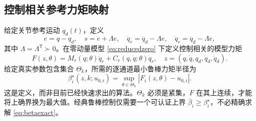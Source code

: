 \documentclass[journal,onecolumn]{IEEEtran}
\newcommand{\abs}[1]{\left\lvert#1\right\rvert}
\newcommand{\tr}{\mathsf T}
\begin{document}
\subsection{控制相关参考力矩映射}
给定关节参考运动 $q_d(t)$，定义
\begin{equation}
 e=q-q_d,\quad s=\dot e+\Lambda e,\quad
 \dot q_r=\dot q_d-\Lambda e,\quad
 \ddot q_r=\ddot q_d-\Lambda\dot e,
 \label{eq:sliding}
\end{equation}
其中 $\Lambda=\Lambda^\tr\succ0$。在零动量模型 \eqref{eq:reducedzero} 下定义控制相关的模型力矩
\begin{equation}
 F(z,\theta)=M_r(q;\theta)\ddot q_r+C_r(q,\dot q;\theta)\dot q_r,\quad
 z=(q,\dot q,q_d,\dot q_d,\ddot q_d).
 \label{eq:F}
\end{equation}
给定真实参数包含集合 $\Theta_k$，所需的逐通道最小鲁棒力矩半径为
\begin{equation}
 \beta_i^\star(z,k;u_{0,i})=\sup_{\theta\in\Theta_k}\abs{F_i(z,\theta)-u_{0,i}}.
 \label{eq:betaexact}
\end{equation}
这是定义，而非目前已经快速求出的算法。$\Theta_k$ 必须是紧集，$F$ 在其上连续，才能将上确界换为最大值。经典鲁棒控制仅需要一个可认证上界 $\bar\beta_i\geq\beta_i^\star$，不必精确求解 \eqref{eq:betaexact}。
\end{document}
